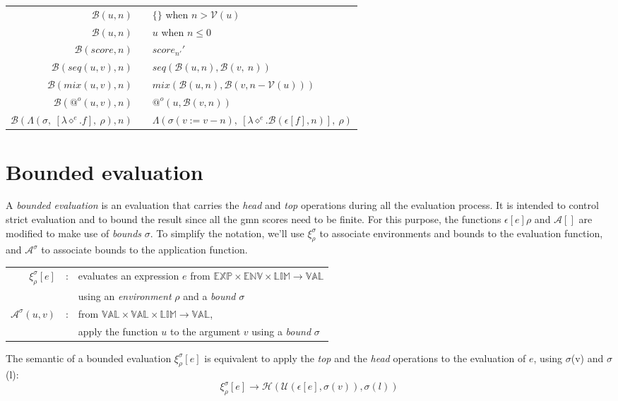 \documentclass[10pt,a4paper,frenchb]{article}
\makeatletter
\newcommand{\evaltable}[1][$\rightarrow$]	  {\begin{center} \begin{tabular*}{\linewidth}{rc@{ #1 }l}}
\newcommand{\evaltablend}  		{\end{tabular*}\end{center}}
\newcommand{\var}[1]		{\ensuremath{\diamond^#1}}
\newcommand{\expr}		{\ensuremath{\mathbb{EXP}}}
\newcommand{\val}		{\ensuremath{\mathbb{VAL}}}
\newcommand{\env}		{\ensuremath{\mathbb{ENV}}}
\newcommand{\clossym}	{\ensuremath{\Lambda}}
\newcommand{\applyop}	{\ensuremath{@}}
\newcommand{\noredex}	{\ensuremath{\applyop^o}}
\newcommand{\bounddomain}{\ensuremath{\mathbb{LIM}}}
\newcommand{\edomain}[3]{$#1 \times #2 \times \bounddomain \rightarrow #3$}
\newcommand{\evalsym}			{\ensuremath{\epsilon}}
\newcommand{\boundevalsym}		{\ensuremath{\xi}}
\newcommand{\envsym}				{\ensuremath{\rho}}
\newcommand{\applysym}			{\ensuremath{\mathcal A}}
\newcommand{\boundapplysym}[1]	{\ensuremath{\applysym^{#1}}}
\newcommand{\closure}[4]			{\ensuremath{\clossym\left(#4,\ \left[\lambdaexpr{#1}{#2}\right],\ #3 \right)}}
\newcommand{\eval}[1]				{\ensuremath{\boundevalsym_\envsym^{#1}}}
\newcommand{\evalexpr}[2][\bounds]	{\ensuremath{\eval{#1}\left[#2\right]}}
\newcommand{\evalss}[1]				{\ensuremath{\evalsym\left[#1\right]}}
\newcommand{\evalsimple}[2][\envsym]	{\ensuremath{\evalsym\left[#2\right]#1}}
\newcommand{\apply}[3][\bounds]		{\ensuremath{\boundapplysym{#1}\left(#2,#3\right)}}
\newcommand{\apexpr}[1] 		{#1(u, v)}
\newcommand{\lambdaexpr}[2]	{\lambda \var{#1}.#2}
\newcommand{\voices}			{\ensuremath{\mathcal V}}
\newcommand{\head}			{\ensuremath{\mathcal H}}
\renewcommand{\top}			{\ensuremath{\mathcal U}}
\newcommand{\bottom}			{\ensuremath{\mathcal B}}
\newcommand{\bounds}			{\ensuremath{\sigma}}
\newcommand{\sevalBottom}[2]				{\ensuremath{\bottom \left(\evalss{#1},#2\right)}}
\newcommand{\bottomScore}[2]		{\ensuremath{#1_{#2'}'}}
\newcommand{\bottomSeq}[3]		{\ensuremath{seq\left(\bottom\left(#1, #3\right), \bottom\left(#2, \ #3\right)\right)}}
\newcommand{\bottomMix}[3]		{\ensuremath{mix\left(\bottom\left(#1, #3\right), \bottom\left(#2, #3-\voices\left(#1\right)\right)\right)}}
\newcommand{\bottomApply}[3]		{\ensuremath{\noredex\left(#1, \bottom\left(#2,#3\right)\right)}}
\newcommand{\bottomClosure}[5][\envsym]	{\closure{#2}{\sevalBottom{#3}{#5}}{#1}{#4(v:=v-#5)}}
\newcommand{\emptyScore}			{\ensuremath{\{\}}}
\newcommand{\identity}[1]		{\ensuremath{#1}}
\makeatother
\begin{document}
\evaltable
 \hline
 $\bottom(u,n)$					& & \emptyScore \: when $n > \voices(u)$ \\
 $\bottom(u,n)$					& & \identity{u} \: when $n \leq 0 $ \\
 $\bottom(score,n)$				& & \bottomScore{score}{n} \\
 $\bottom(\apexpr{seq},n)$		& & \bottomSeq{u}{v}{n} \\
 $\bottom(\apexpr{mix},n)$ 		& & \bottomMix{u}{v}{n} \\
 $\bottom(\noredex (u,v),n)$ 	& & \bottomApply{u}{v}{n} \\
 $\bottom(\closure{e}{f}{\envsym}{\bounds},n)$ 	& & \bottomClosure{e}{f}{\bounds}{n} \\
 \hline
\evaltablend


\section{Bounded evaluation}

A \emph{bounded evaluation} is an evaluation that carries the \emph{head} and \emph{top} operations during all the evaluation process. 
It is intended to control strict evaluation and to bound the result since all the gmn scores need to be finite.
For this purpose, the functions $\evalsimple{e}$ and $\applysym[]$ are modified to make use of \emph{bounds} $\bounds$. To simplify the notation, we'll use $\eval{\bounds}$ to associate environments and bounds to the evaluation function, and $\boundapplysym{\bounds}$ to associate bounds to the application function. 
\begin{center}
\begin{tabular}{rcl}
$\evalexpr{e}$ & : & evaluates an expression $e$ from \edomain{\expr}{\env}{\val} \\
		  & & using an \emph{environment} $\envsym$ and a \emph{bound} $\bounds$ \\
$\apply{u}{v}$  & : & from \edomain{\val}{\val}{\val}, \\
			& & apply the function $u$ to the argument $v$ using a \emph{bound} $\bounds$ \\
\end{tabular}
\end{center}

The semantic of a bounded evaluation $\evalexpr{e}$ is equivalent to apply the \emph{top} and the \emph{head} operations to the evaluation of $e$, using \bounds(v) and \bounds(l):
\begin{equation}
\label{equiv}
 \evalexpr{e} \rightarrow \head( \top( \evalss{e}, \bounds(v)), \bounds(l))
\end{equation}
\end{document}
